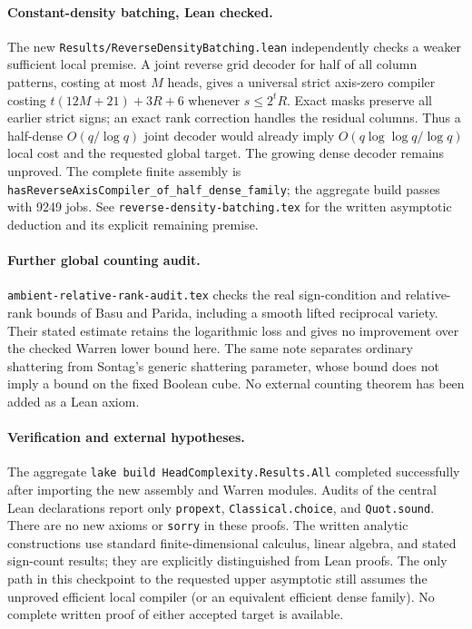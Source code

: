 \documentclass[11pt]{article}
\begin{document}
\paragraph{Constant-density batching, Lean checked.}
The new \texttt{Results/ReverseDensityBatching.lean} independently
checks a weaker sufficient local premise. A joint reverse grid decoder
for half of all column patterns, costing at most $M$ heads, gives a
universal strict axis-zero compiler costing
$t(12M+21)+3R+6$ whenever $s\leq2^tR$. Exact masks preserve all earlier
strict signs; an exact rank correction handles the residual columns.
Thus a half-dense $O(q/\log q)$ joint decoder would already imply
$O(q\log\log q/\log q)$ local cost and the requested global target.
The growing dense decoder remains unproved. The complete finite
assembly is \texttt{hasReverseAxisCompiler\_of\_half\_dense\_family};
the aggregate build passes with 9249 jobs. See
\texttt{reverse-density-batching.tex} for the written asymptotic
deduction and its explicit remaining premise.

\paragraph{Further global counting audit.}
\texttt{ambient-relative-rank-audit.tex} checks the real sign-condition
and relative-rank bounds of Basu and Parida, including a smooth lifted
reciprocal variety. Their stated estimate retains the logarithmic loss
and gives no improvement over the checked Warren lower bound here.
The same note separates ordinary shattering from Sontag's generic
shattering parameter, whose bound does not imply a bound on the fixed
Boolean cube. No external counting theorem has been added as a Lean axiom.

\paragraph{Verification and external hypotheses.}
The aggregate \texttt{lake build HeadComplexity.Results.All} completed
successfully after importing the new assembly and Warren modules.
Audits of the central Lean declarations report only
\texttt{propext}, \texttt{Classical.choice}, and \texttt{Quot.sound}.
There are no new axioms or \texttt{sorry} in these proofs.
The written analytic constructions use standard finite-dimensional
calculus, linear algebra, and stated sign-count results; they are
explicitly distinguished from Lean proofs. The only path in this
checkpoint to the requested upper asymptotic still assumes the
unproved efficient local compiler (or an equivalent efficient dense
family). No complete written proof of either accepted target is
available.
\end{document}
